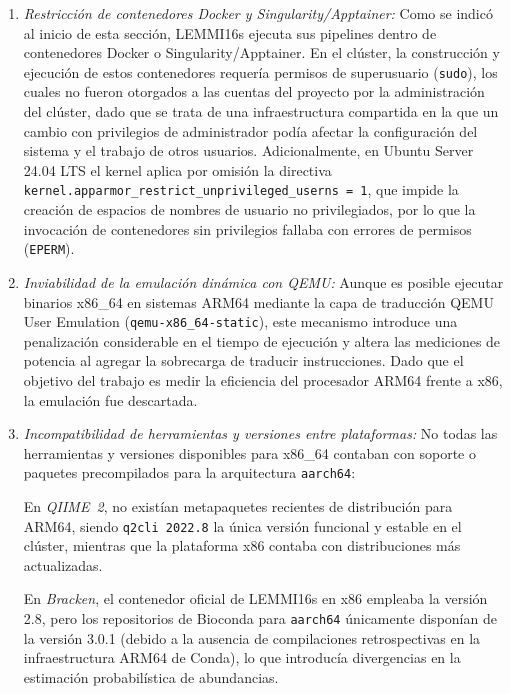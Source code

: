 \documentclass[12pt,oneside,spanish]{book}
\begin{document}
    \begin{enumerate}
        \item \textit{Restricción de contenedores Docker y Singularity/Apptainer:} Como se indicó al inicio de esta sección, LEMMI16s ejecuta sus pipelines dentro de contenedores Docker o Singularity/Apptainer. En el clúster, la construcción y ejecución de estos contenedores requería permisos de superusuario (\texttt{sudo}), los cuales no fueron otorgados a las cuentas del proyecto por la administración del clúster, dado que se trata de una infraestructura compartida en la que un cambio con privilegios de administrador podía afectar la configuración del sistema y el trabajo de otros usuarios. Adicionalmente, en Ubuntu Server 24.04 LTS el kernel aplica por omisión la directiva \texttt{kernel.}\allowbreak\texttt{apparmor\_}\allowbreak\texttt{restrict\_}\allowbreak\texttt{unprivileged\_}\allowbreak\texttt{userns = 1}, que impide la creación de espacios de nombres de usuario no privilegiados, por lo que la invocación de contenedores sin privilegios fallaba con errores de permisos (\texttt{EPERM}).
        
        \item \textit{Inviabilidad de la emulación dinámica con QEMU:} Aunque es posible ejecutar binarios x86\_64 en sistemas ARM64 mediante la capa de traducción QEMU User Emulation (\texttt{qemu-x86\_64-static}), este mecanismo introduce una penalización considerable en el tiempo de ejecución y altera las mediciones de potencia al agregar la sobrecarga de traducir instrucciones. Dado que el objetivo del trabajo es medir la eficiencia del procesador ARM64 frente a x86, la emulación fue descartada.
        
        \item \textit{Incompatibilidad de herramientas y versiones entre plataformas:} No todas las herramientas y versiones disponibles para x86\_64 contaban con soporte o paquetes precompilados para la arquitectura \texttt{aarch64}:
        
        En \textit{QIIME~2}, no existían metapaquetes recientes de distribución para ARM64, siendo \texttt{q2cli 2022.8} la única versión funcional y estable en el clúster, mientras que la plataforma x86 contaba con distribuciones más actualizadas.
        
        En \textit{Bracken}, el contenedor oficial de LEMMI16s en x86 empleaba la versión 2.8, pero los repositorios de Bioconda para \texttt{aarch64} únicamente disponían de la versión 3.0.1 (debido a la ausencia de compilaciones retrospectivas en la infraestructura ARM64 de Conda), lo que introducía divergencias en la estimación probabilística de abundancias.
        

\end{enumerate}
\end{document}
